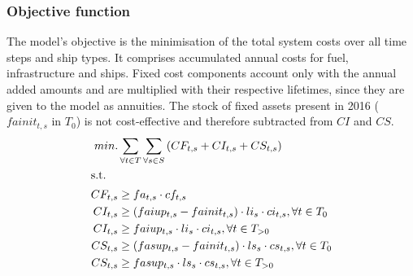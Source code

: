 \documentclass[article]{elsarticle}
\begin{document}
\subsubsection{Objective function}
The model's objective is the minimisation of the total system costs over all time steps and ship types. It comprises accumulated annual costs for fuel, infrastructure and ships. Fixed cost components account only with the annual added amounts and are multiplied with their respective lifetimes, since they are given to the model as annuities. The stock of fixed assets present in 2016 ($fainit_{t,s}$ in $T_0$) is not cost-effective and therefore subtracted from $CI$ and $CS$.
\begin{subequations}
    \begin{align}
        min. &\sum_{\forall t \in T}\sum_{\forall s \in S}\left( CF_{t, s} + CI_{t, s} + CS_{t, s} \right)\label{eq:objective}\\
        \intertext{s.t.}
        CF_{t, s} &\geq fa_{t,s} \cdot cf_{t,s}\\
        CI_{t, s} &\geq \left( faiup_{t,s} - fainit_{t, s} \right) \cdot li_{s} \cdot ci_{t,s}, \forall t \in T_0\\
        CI_{t, s} &\geq faiup_{t,s} \cdot li_{s} \cdot ci_{t,s}, \forall t \in T_{>0}\\
        CS_{t, s} &\geq \left( fasup_{t,s} - fainit_{t, s} \right) \cdot ls_{s} \cdot cs_{t,s}, \forall t \in T_0\\
        CS_{t, s} &\geq fasup_{t,s} \cdot ls_{s} \cdot cs_{t,s}, \forall t \in T_{>0}
    \end{align}
\end{subequations}
\end{document}
